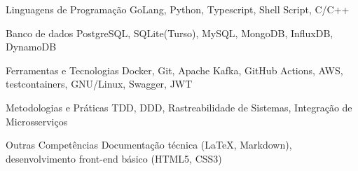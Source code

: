 
\begin{cvskills}
  \cvskill
  {Linguagens de Programação}
  {GoLang, Python, Typescript, Shell Script, C/C++}

  \cvskill
  {Banco de dados}
  {PostgreSQL, SQLite(Turso), MySQL, MongoDB, InfluxDB, DynamoDB}

  \cvskill
  {Ferramentas e Tecnologias}
  {Docker, Git, Apache Kafka, GitHub Actions, AWS, testcontainers, GNU/Linux, Swagger, JWT}

  \cvskill
  {Metodologias e Práticas}
  {TDD, DDD, Rastreabilidade de Sistemas, Integração de Microsserviços}

  \cvskill
  {Outras Competências}
  {Documentação técnica (LaTeX, Markdown), desenvolvimento front-end básico (HTML5, CSS3)}
\end{cvskills}
